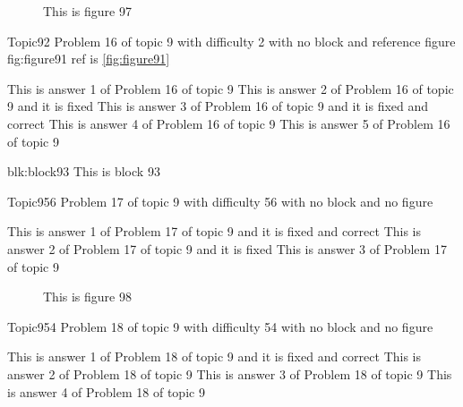 \documentclass[master]{exam}
\begin{document}
\begin{figure}
	\begin{center}
		This is figure 97 
		\label{fig:figure97}
	\end{center}
\end{figure}

\begin{problem}{Topic9}{2}
	Problem 16 of topic 9 with difficulty 2 with no block and reference figure fig:figure91 ref is \ref{fig:figure91}
	\begin{answers}
		\answer This is answer 1 of Problem 16 of topic 9 
		\answer[fixed] This is answer 2 of Problem 16 of topic 9 and it is fixed
		 This is answer 3 of Problem 16 of topic 9 and it is fixed and correct
		\answer This is answer 4 of Problem 16 of topic 9 
		\answer This is answer 5 of Problem 16 of topic 9 
	\end{answers}
\end{problem}



\begin{block}{blk:block93}
This is block 93
\end{block}


\begin{problem}{Topic9}{56}
	Problem 17 of topic 9 with difficulty 56 with no block and no figure
	\begin{answers}
		 This is answer 1 of Problem 17 of topic 9 and it is fixed and correct
		\answer[fixed] This is answer 2 of Problem 17 of topic 9 and it is fixed
		\answer This is answer 3 of Problem 17 of topic 9 
	\end{answers}
\end{problem}



\begin{figure}
	\begin{center}
		This is figure 98 
		\label{fig:figure98}
	\end{center}
\end{figure}

\begin{problem}{Topic9}{54}
	Problem 18 of topic 9 with difficulty 54 with no block and no figure
	\begin{answers}
		 This is answer 1 of Problem 18 of topic 9 and it is fixed and correct
		\answer This is answer 2 of Problem 18 of topic 9 
		\answer This is answer 3 of Problem 18 of topic 9 
		\answer This is answer 4 of Problem 18 of topic 9 
	\end{answers}
\end{problem}
\end{document}
